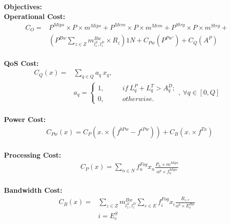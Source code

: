 \documentclass{article}
\begin{document}
\pagebreak

\noindent\textbf{Objectives:}\\[12pt]
\noindent\textbf{Operational Cost:}\\[6pt]
\begin{equation*}
\begin{split}
C_O = & P^{Mips} \times P \times m^{Mips} + P^{Mem} \times P \times m^{Mem} + P^{Strg}\times P\times m^{Strg} + \\
& \left(P^{Bw} \sum_{z\in Z} m^{Bw}_{l^S_z,l^D_z} \times R_z\right)1N + C_{Pw}(P^{Pw'}) + C_{Q}(A^P)
\end{split}
\end{equation*}\\[6pt]

\noindent\textbf{QoS Cost:}\\[6pt]
\begin{equation*}
\begin{aligned}
C_{Q}(x) = & \sum_{q \in Q} a_q~ x_q,\\[6pt]
& a_q = \left\{
			\begin{array}{ll}
			1, \qquad ~~~ if ~L^P_q + L^T_q > A^D_q;\\[6pt]
			0, \qquad ~~~ otherwise.
			\end{array}
			\right.,~ \forall q \in [0, Q]
\end{aligned}
\end{equation*}\\[6pt]

\noindent\textbf{Power Cost:}\\[6pt]
\begin{equation*}
\begin{aligned}
& C_{Pw}(x) = C_P(x.\times(f^{bPw} - f^{iPw})) + C_B(x.\times f^{Tx})
\end{aligned}
\end{equation*}\\[6pt]

\noindent\textbf{Processing Cost:}\\[6pt]
\begin{equation*}
\begin{aligned}
& C_P(x) = \sum_{n\in N} f^{Fog}_n x_n \frac{P_n \times m^{Mips}}{\alpha^p \times f_n^{Mips}}
\end{aligned}
\end{equation*}\\[6pt]

\noindent\textbf{Bandwidth Cost:}\\[6pt]
\begin{equation*}
\begin{split}
C_B(x) = & \sum_{z\in Z} m^{Bw}_{l^S_z,l^D_z} \sum_{e\in E} f^{Fog}_i x_i \frac{R_{z, e}}{\alpha^b \times E^{Bw}_{e}} \\[6pt]
&i = E^S_e
\end{split}
\end{equation*}\\[6pt]
\end{document}
